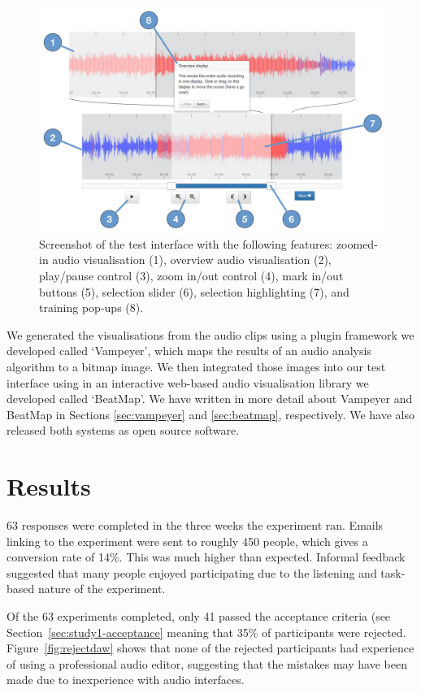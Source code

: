 \begin{figure}[ht]
\centering
\includegraphics[width=\columnwidth]{figs/browser-audio-interface.pdf}
\caption{Screenshot of the test interface with the following features:
zoomed-in audio visualisation (1),
overview audio visualisation (2),
play/pause control (3),
zoom in/out control (4),
mark in/out buttons (5),
selection slider (6),
selection highlighting (7),
and training pop-ups (8).}
\label{fig:visualisation-interface}
\end{figure}

We generated the visualisations from the audio clips using a plugin framework we developed called `Vampeyer', which
maps the results of an audio analysis algorithm to a bitmap image. We then integrated those images into our test
interface using in an interactive web-based audio visualisation library we developed called `BeatMap'.  We have written
in more detail about Vampeyer and BeatMap in Sections \ref{sec:vampeyer} and \ref{sec:beatmap}, respectively. We have
also released both systems as open source software.

\section{Results}
63 responses were completed in the three weeks the experiment ran. Emails linking to the experiment were sent to
roughly 450 people, which gives a conversion rate of 14\%. This was much higher than expected. Informal feedback
suggested that many people enjoyed participating due to the listening and task-based nature of the experiment. 

Of the 63 experiments completed, only 41 passed the acceptance criteria (see Section~\ref{sec:study1-acceptance}
meaning that 35\% of participants were rejected. Figure~\ref{fig:rejectdaw} shows that none of the rejected
participants had experience of using a professional audio editor, suggesting that the mistakes may have been made due
to inexperience with audio interfaces.

